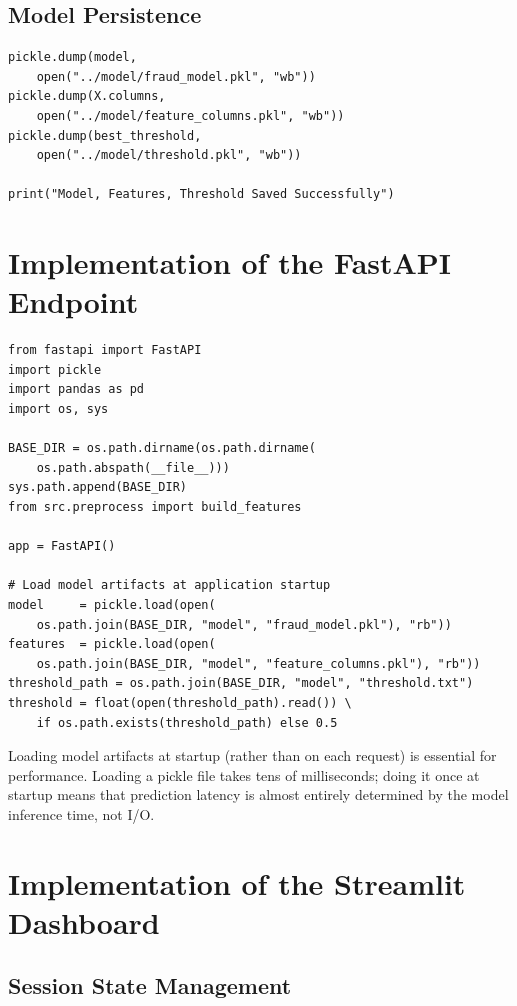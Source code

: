 \subsection{Model Persistence}

\begin{lstlisting}[caption={Saving trained model artifacts}, label={lst:save}]
pickle.dump(model,
    open("../model/fraud_model.pkl", "wb"))
pickle.dump(X.columns,
    open("../model/feature_columns.pkl", "wb"))
pickle.dump(best_threshold,
    open("../model/threshold.pkl", "wb"))

print("Model, Features, Threshold Saved Successfully")
\end{lstlisting}

\section{Implementation of the FastAPI Endpoint}

\begin{lstlisting}[caption={FastAPI application setup and model loading}, label={lst:fastapisetup}]
from fastapi import FastAPI
import pickle
import pandas as pd
import os, sys

BASE_DIR = os.path.dirname(os.path.dirname(
    os.path.abspath(__file__)))
sys.path.append(BASE_DIR)
from src.preprocess import build_features

app = FastAPI()

# Load model artifacts at application startup
model     = pickle.load(open(
    os.path.join(BASE_DIR, "model", "fraud_model.pkl"), "rb"))
features  = pickle.load(open(
    os.path.join(BASE_DIR, "model", "feature_columns.pkl"), "rb"))
threshold_path = os.path.join(BASE_DIR, "model", "threshold.txt")
threshold = float(open(threshold_path).read()) \
    if os.path.exists(threshold_path) else 0.5
\end{lstlisting}

Loading model artifacts at startup (rather than on each request) is essential for performance. Loading a pickle file takes tens of milliseconds; doing it once at startup means that prediction latency is almost entirely determined by the model inference time, not I/O.

\section{Implementation of the Streamlit Dashboard}

\subsection{Session State Management}

